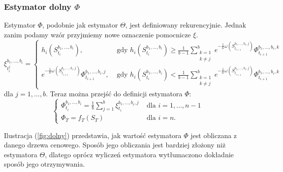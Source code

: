 \documentclass[12pt]{article}
\begin{document}
\subsubsection{Estymator dolny $\Phi$}

Estymator $\Phi$, podobnie jak estymator $\Theta$, jest  definiowany rekurencyjnie. Jednak zanim podamy wzór przyjmiemy nowe oznaczenie pomocnicze $\xi$.
\begin{equation}
\label{eq:ksi}
\xi_{t_i^j}^{b_1,\ldots, b_i} = \left\{ \begin{array}{ll}
h_i(S_{t_i}^{b_1,\ldots, b_i}), & \textrm{ gdy }h_i(S_{t_i}^{b_1,\ldots, b_i}) \geq \frac{1}{b-1} \sum_{\substack{k = 1\\k \neq j}}^b e^{-\frac{1}{n}\omega(S_{t_{i+1}}^{b_1,\ldots,b_i,j})} \Phi_{t_{i+1}}^{b_1,\ldots, b_i,k}\\
e^{-\frac{1}{n}\omega(S_{t_{i+1}}^{b_1,\ldots,b_i,j})} \Phi_{t_{i+1}}^{b_1,\ldots, b_i,j}, & \textrm{ gdy }h_i(S_{t_i}^{b_1,\ldots, b_i}) < \frac{1}{b-1} \sum_{\substack{k = 1\\k \neq j}}^b e^{-\frac{1}{n}\omega(S_{t_{i+1}}^{b_1,\ldots,b_i,j})} \Phi_{t_{i+1}}^{b_1,\ldots, b_i,k}
\end{array} \right.
\end{equation}
dla $j=1,\ldots,b$. Teraz można przejść do definicji estymatora $\Phi$:
\begin{equation}
\label{eq:dolny}
\left\{ \begin{array}{ll}
\Phi_{t_i}^{b_1,\ldots,b_i} = \frac{1}{b} \sum_{j=1}^b \xi_{t_i}^{b_1,\ldots,b_i,j} & \textrm{ dla } i =1,\ldots,n-1\\
\Phi_T = f_T(S_T) & \textrm{ dla } i=n.
\end{array} \right.
\end{equation}

\noindent Ilustracja (\ref{fig:dolny}) przedstawia, jak wartość estymatora $\Phi$ jest obliczana z danego drzewa cenowego. Sposób jego obliczania jest bardziej złożony niż estymatora $\Theta$, dlatego oprócz wyliczeń estymatora wytłumaczono dokładnie sposób jego otrzymywania. 
\end{document}

